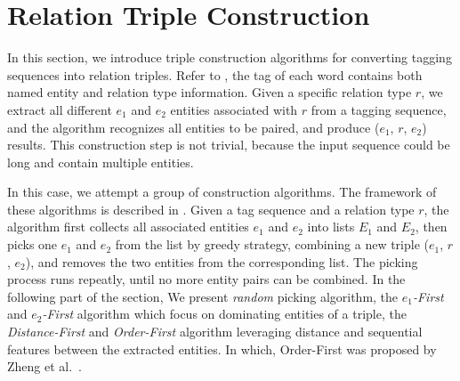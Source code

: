 \section{Relation Triple Construction}
\label{sec:triple}

In this section, we introduce triple construction algorithms for
converting tagging sequences into relation triples.
Refer to , the tag of each word contains 
both named entity and relation type information.
Given a specific relation type $r$, we extract all
different $e_1$ and $e_2$ entities associated with $r$ from a tagging sequence,
and the algorithm recognizes all entities to be paired, and produce ($e_1$, $r$, $e_2$) results.
This construction step is not trivial,
because the input sequence could be long and contain multiple entities.

In this case, we attempt a group of construction algorithms.
The framework of these algorithms is described in .
Given a tag sequence and a relation type $r$,
the algorithm first collects all associated entities $e_1$ and $e_2$ into lists $E_1$ and $E_2$,
then picks one $e_1$ and $e_2$ from the list by greedy strategy,
combining a new triple ($e_1$, $r$, $e_2$),
and removes the two entities from the corresponding list.
The picking process runs repeatly, until no more entity pairs can be combined.
In the following part of the section, We present \textit{random} picking algorithm,
the \textit{$e_1$-First} and \textit{$e_2$-First} algorithm which focus on dominating entities of a triple,
the \textit{Distance-First} and \textit{Order-First} algorithm
leveraging distance and sequential features between the extracted entities.
In which, Order-First was proposed by Zheng et al.~.





